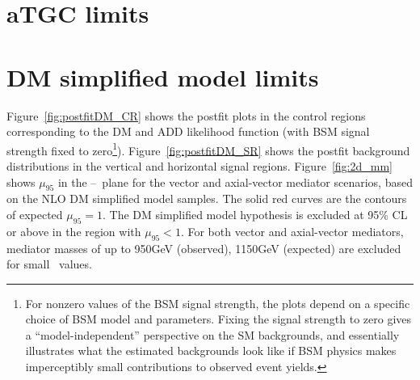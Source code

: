 \section{aTGC limits} \label{sec:results_aTGC}
\section{DM simplified model limits} \label{sec:results_DM}
Figure~\ref{fig:postfitDM_CR} shows the postfit plots in the control regions corresponding to the DM and ADD likelihood function (with
BSM signal strength fixed to zero\footnote{For nonzero values of the BSM signal strength, the plots depend on a specific choice of BSM model
and parameters. Fixing the signal strength to zero gives a ``model-independent'' perspective on the SM backgrounds,
and essentially illustrates what the estimated backgrounds look like if BSM physics makes imperceptibly
small contributions to observed event yields.}).
Figure~\ref{fig:postfitDM_SR} shows the postfit background distributions in the vertical and horizontal signal regions.
Figure~\ref{fig:2d_mm} shows $\mu_{95}$ in the \mmed--\mdm\ plane for the  vector and
axial-vector mediator scenarios, based on the NLO DM simplified model samples. The solid red curves are the
contours of expected $\mu_{95} = 1$. The DM simplified model hypothesis is excluded at 95\% CL or above in the region with $\mu_{95} < 1$.
For both vector and axial-vector mediators, mediator masses of up to 950\unit{GeV} (observed), 1150\unit{GeV} (expected) are excluded
for small \mdm\ values.

